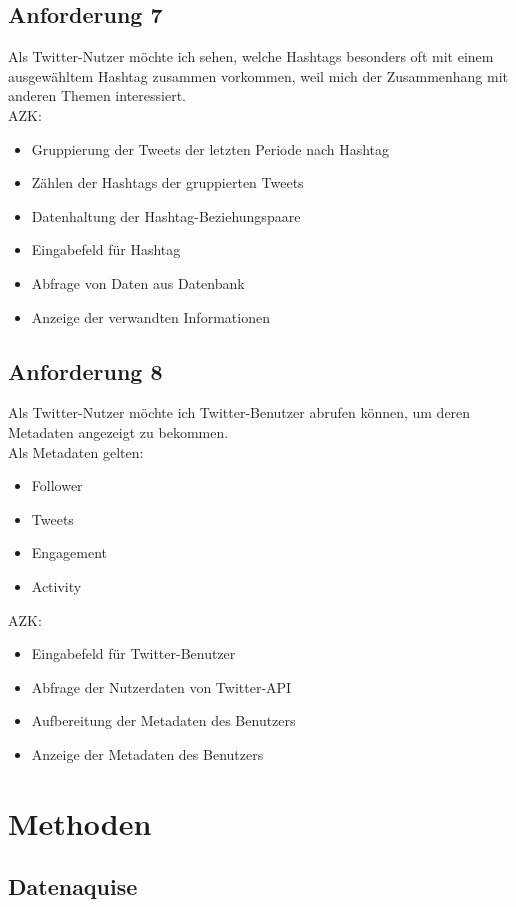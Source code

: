 \documentclass[conference]{IEEEtran}
\begin{document}
\subsection{Anforderung 7}
Als Twitter-Nutzer möchte ich sehen,
welche Hashtags besonders oft mit einem ausgewähltem Hashtag zusammen vorkommen,
weil mich der Zusammenhang mit anderen Themen interessiert.
\\
AZK:
\begin{itemize}
        \item Gruppierung der Tweets der letzten Periode nach Hashtag
        \item Zählen der Hashtags der gruppierten Tweets
        \item Datenhaltung der Hashtag-Beziehungspaare
        \item Eingabefeld für Hashtag
        \item Abfrage von Daten aus Datenbank
        \item Anzeige der verwandten Informationen
\end{itemize}

\subsection{Anforderung 8}
Als Twitter-Nutzer möchte ich Twitter-Benutzer abrufen können,
um deren Metadaten angezeigt zu bekommen.
\\
Als Metadaten gelten:
\begin{itemize}
        \item Follower
        \item Tweets
        \item Engagement
        \item Activity
\end{itemize}
AZK:
\begin{itemize}
        \item Eingabefeld für Twitter-Benutzer
        \item Abfrage der Nutzerdaten von Twitter-API
        \item Aufbereitung der Metadaten des Benutzers
        \item Anzeige der Metadaten des Benutzers
\end{itemize}


\section{Methoden}

\subsection*{Datenaquise}
\end{document}
